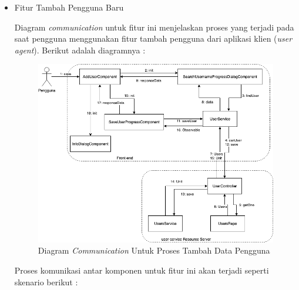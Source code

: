 \documentclass[pdftex,12pt, oneside]{article}
\begin{document}
\begin{itemize}
	\item Fitur Tambah Pengguna Baru
	
	Diagram \textit{communication} untuk fitur ini menjelaskan proses yang terjadi pada saat pengguna menggunakan fitur tambah pengguna dari aplikasi klien (\textit{user agent}). Berikut adalah diagramnya :
	
	\begin{figure}[H]
		\centering
		\includegraphics[width=1\textwidth]{./resources/comm-dia-add-user}
		\caption{Diagram \textit{Communication} Untuk Proses Tambah Data Pengguna}
		\label{fig:comm-dia-add-user}
	\end{figure}
	
	Proses komunikasi antar komponen untuk fitur ini akan terjadi seperti skenario berikut :
	

\end{itemize}
\end{document}
